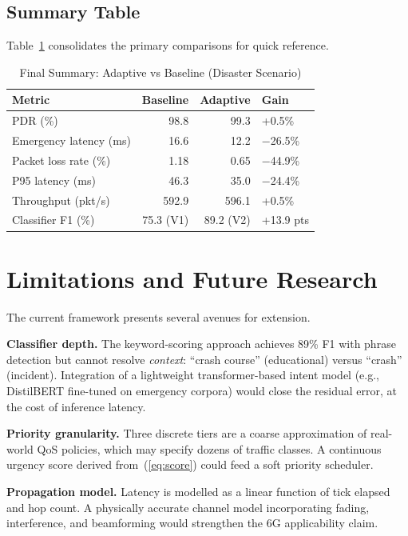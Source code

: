 \documentclass[conference]{IEEEtran}
\begin{document}
\subsection{Summary Table}

Table~\ref{tab:summary} consolidates the primary comparisons for quick reference.

\begin{table}[htbp]
\centering
\caption{Final Summary: Adaptive vs Baseline (Disaster Scenario)}
\label{tab:summary}
\begin{tabular}{lrrl}
\toprule
\textbf{Metric} & \textbf{Baseline} & \textbf{Adaptive} & \textbf{Gain} \\
\midrule
PDR (\%)              & 98.8 & 99.3  & +0.5\% \\
Emergency latency (ms)& 16.6 & 12.2  & $-$26.5\% \\
Packet loss rate (\%) & 1.18 & 0.65  & $-$44.9\% \\
P95 latency (ms)      & 46.3 & 35.0  & $-$24.4\% \\
Throughput (pkt/s)    & 592.9& 596.1 & +0.5\% \\
Classifier F1 (\%)    & 75.3 (V1) & 89.2 (V2) & +13.9 pts \\
\bottomrule
\end{tabular}
\end{table}

\section{Limitations and Future Research}

The current framework presents several avenues for extension.

\textbf{Classifier depth.}  The keyword-scoring approach achieves 89\% F1
with phrase detection but cannot resolve \emph{context}: ``crash course''
(educational) versus ``crash'' (incident).  Integration of a lightweight
transformer-based intent model (e.g., DistilBERT fine-tuned on emergency
corpora) would close the residual error, at the cost of inference latency.

\textbf{Priority granularity.}  Three discrete tiers are a coarse
approximation of real-world QoS policies, which may specify dozens of traffic
classes.  A continuous urgency score derived from~(\ref{eq:score}) could feed
a soft priority scheduler.

\textbf{Propagation model.}  Latency is modelled as a linear function of tick
elapsed and hop count.  A physically accurate channel model incorporating
fading, interference, and beamforming would strengthen the 6G applicability
claim.
\end{document}

